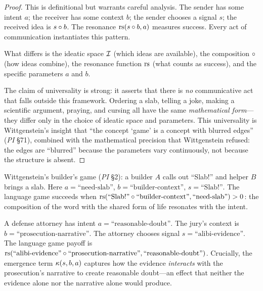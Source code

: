 \begin{proof}
This is definitional but warrants careful analysis. The sender has some
intent $a$; the receiver has some context $b$; the sender chooses a signal
$s$; the received idea is $s \circ b$. The resonance
$\mathrm{rs}(s \circ b, a)$ measures success. Every act of communication
instantiates this pattern.

What differs is the ideatic space $\mathcal{I}$ (which ideas are available), the
composition $\circ$ (how ideas combine), the resonance function $\mathrm{rs}$
(what counts as success), and the specific parameters $a$ and $b$.

The claim of universality is strong: it asserts that there is \emph{no}
communicative act that falls outside this framework. Ordering a slab,
telling a joke, making a scientific argument, praying, and cursing all
have the same \emph{mathematical form}---they differ only in the choice
of ideatic space and parameters. This universality is Wittgenstein's
insight that ``the concept `game' is a concept with blurred edges''
(\emph{PI} \S71), combined with the mathematical precision that
Wittgenstein refused: the edges are ``blurred'' because the parameters
vary continuously, not because the structure is absent.
\end{proof}

\begin{example}
Wittgenstein's builder's game (\emph{PI} \S2): a builder $A$ calls out
``Slab!'' and helper $B$ brings a slab. Here $a = \text{``need-slab''}$,
$b = \text{``builder-context''}$, $s = \text{``Slab!''}$. The language game
succeeds when $\mathrm{rs}(\text{``Slab!''} \circ \text{``builder-context''},
\text{``need-slab''}) > 0$: the composition of the word with the shared
form of life resonates with the intent.
\end{example}

\begin{example}
A defense attorney has intent $a = \text{``reasonable-doubt''}$. The jury's
context is $b = \text{``prosecution-narrative''}$. The attorney chooses signal
$s = \text{``alibi-evidence''}$. The language game payoff is
$\mathrm{rs}(\text{``alibi-evidence''} \circ \text{``prosecution-narrative''},
\text{``reasonable-doubt''})$. Crucially, the emergence term
$\kappa(s, b, a)$ captures how the evidence \emph{interacts} with the
prosecution's narrative to create reasonable doubt---an effect that neither
the evidence alone nor the narrative alone would produce.
\end{example}

